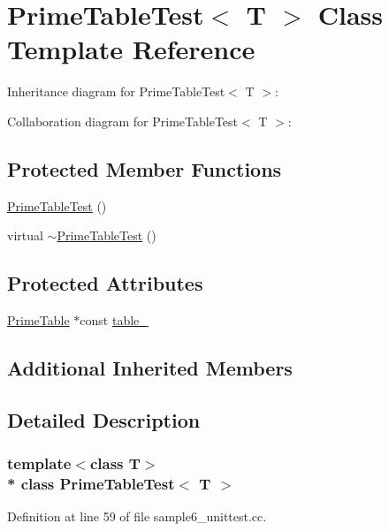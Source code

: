 \hypertarget{class_prime_table_test}{}\section{Prime\+Table\+Test$<$ T $>$ Class Template Reference}
\label{class_prime_table_test}


Inheritance diagram for Prime\+Table\+Test$<$ T $>$\+:


Collaboration diagram for Prime\+Table\+Test$<$ T $>$\+:
\subsection*{Protected Member Functions}
\begin{DoxyCompactItemize}
\item 
\hyperlink{class_prime_table_test_ab83d0b24b41bff1ace55f9a8d5ea6dcf}{Prime\+Table\+Test} ()
\item 
virtual \hyperlink{class_prime_table_test_a4fb27ce277675d58ea3f8db99e3bb2b4}{$\sim$\+Prime\+Table\+Test} ()
\end{DoxyCompactItemize}
\subsection*{Protected Attributes}
\begin{DoxyCompactItemize}
\item 
\hyperlink{class_prime_table}{Prime\+Table} $\ast$const \hyperlink{class_prime_table_test_a86da90fc6d5cef6386d0cd8fb52b4046}{table\+\_\+}
\end{DoxyCompactItemize}
\subsection*{Additional Inherited Members}


\subsection{Detailed Description}
\subsubsection*{template$<$class T$>$\\*
class Prime\+Table\+Test$<$ T $>$}



Definition at line 59 of file sample6\+\_\+unittest.\+cc.



